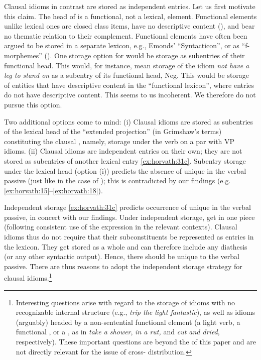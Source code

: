 \documentclass[output=paper,
modfonts
]{LSP/langsci}
\begin{document}
Clausal idioms in contrast are stored as independent entries. Let us
first motivate this claim. The head of  is a functional,
not a lexical, element. Functional elements unlike lexical ones are
closed class items, have no descriptive content (\citealt{abney1987}), and bear
no thematic relation to their complement. Functional elements have often
been argued to be stored in a separate lexicon, e.g., Emonds' \citeyear{emonds2000}
``Syntacticon'', or as ``f-morphemes'' (). One storage
option for  would be storage as subentries of their
functional head. This would, for instance, mean storage of the idiom \emph{not have a leg to stand on} as a subentry of its functional head, Neg. This would be storage of entities that have descriptive
content in the ``functional lexicon'', where entries do not have
descriptive content. This seems to us incoherent. We therefore do not
pursue this option.

Two additional options come to mind: (i) Clausal idioms are stored as
subentries of the lexical head of the ``extended projection'' (in
Grimshaw's \citeyear{grimshaw1991} terms) constituting the clausal , namely,
storage under the verb on a par with VP idioms. (ii) Clausal idioms are
independent entries on their own; they are not stored as subentries of
another lexical entry \ref{ex:horvath:31c}. Subentry storage under the lexical head
(option (i)) predicts the absence of unique  in the verbal
passive (just like in the case of ); this is contradicted
by our findings (e.g. \ref{ex:horvath:15}--\ref{ex:horvath:18}).

Independent storage \ref{ex:horvath:31c} predicts occurrence of unique 
in the verbal passive, in concert with our findings. Under independent
storage,  get  in one piece (following
consistent use of the expression in the relevant contexts). Clausal
idioms thus do not require that their subconstituents be represented as
entries in the lexicon. They get stored as a whole and can therefore
include any diathesis (or any other syntactic output). Hence, there
should be  unique to the verbal passive. There are thus
reasons to adopt the independent storage strategy for clausal
idioms.\footnote{Interesting questions arise with regard to the storage
  of idioms with no recognizable internal structure (e.g., \emph{trip
  the light fantastic}), as well as idioms (arguably) headed by a
  non-sentential functional element (a light verb, a functional
  , or a , as in \emph{take a shower}, \emph{in a
  rut,} and \emph{cut and dried}, respectively). These important
  questions are beyond the  of this paper and are not directly
  relevant for the issue of cross- distribution.}
\end{document}
